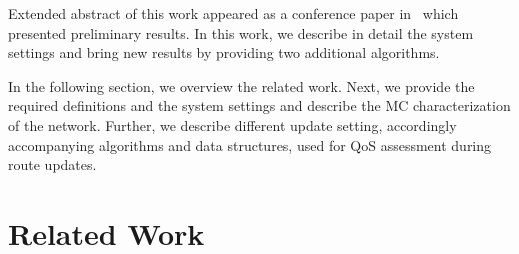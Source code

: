 \begin{multicols}{2}
%
%
%
%
%



Extended abstract of this work appeared as a conference paper 
in~\cite{frenkel_predicting_2017} which presented preliminary results. 
In this work, we describe in detail the system settings and bring new results 
by providing two additional algorithms.
{

}

In the following section, we overview the related work. Next, we provide 
the required definitions and the system settings and describe the MC 
characterization of the network. Further, we describe different update setting, 
accordingly accompanying algorithms and data structures, used for QoS assessment 
during route updates.

\vspace*{-9pt}

\section{Related Work}
\label{sec:related_work}


\end{multicols}
